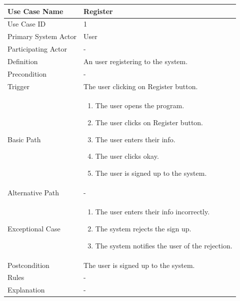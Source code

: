 \documentclass[a4paper,12pt]{report}
\begin{document}
		\begin{tabular}{|m{4cm}|m{11.5cm}|}
			\hline
					Use Case Name & Register\\
				\hline
					Use Case ID & 1\\
				\hline
					Primary System Actor & User\\
				\hline
					Participating Actor & -\\
				\hline
					Definition & An user registering to the system.\\
				\hline
					Precondition & -\\
				\hline
					Trigger & The user clicking on Register button.\\
				\hline
					Basic Path & \begin{enumerate}
						\item The user opens the program.
						\item The user clicks on Register button.
						\item The user enters their info.
						\item The user clicks okay.
						\item The user is signed up to the system.
					\end{enumerate}		
					\\
				\hline
					Alternative Path & -\\
				\hline
					Exceptional Case & \begin{enumerate}
						\item The user enters their info incorrectly.
						\item The system rejects the sign up.
						\item The system notifies the user of the rejection.
					\end{enumerate}
					
					\\
				\hline
					Postcondition & The user is signed up to the system.\\
				\hline
					Rules & -\\
				\hline
					Explanation & -\\
			\hline
		\end{tabular}
\end{document}
